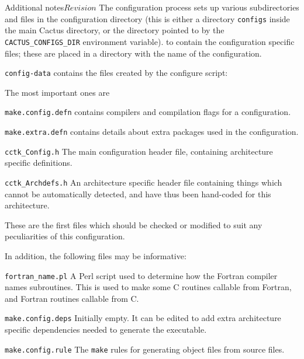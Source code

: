 \begin{cactuspart}{Additional notes}{}{$Revision$}
The configuration process sets up various subdirectories and files in the
configuration
directory (this is either a directory
\texttt{configs} inside the main Cactus directory, or the
directory pointed to by the \texttt{CACTUS\_CONFIGS\_DIR} environment
variable).
to contain the configuration specific files; these
are placed in a directory with the name of the configuration.

\begin{Lentry}

\item [\texttt{config-data}] contains the files created by the configure
script:

The most important ones are

\begin{Lentry}

\item [\texttt{make.config.defn}]
contains compilers and compilation flags for a configuration.

\item [\texttt{make.extra.defn}]
contains details about extra packages used in the configuration.

\item [\texttt{cctk\_Config.h}]
The main configuration header file, containing architecture specific
definitions.

\item [\texttt{cctk\_Archdefs.h}]
An architecture specific header file containing things which cannot be
automatically detected, and have thus been hand-coded for this architecture.
\end{Lentry}

These are the first files which should be checked or modified to suit any
peculiarities of this configuration.

In addition, the following files may be informative:

\begin{Lentry}
\item [\texttt{fortran\_name.pl}]
A Perl script used to determine how the Fortran compiler names subroutines.
This is used to make some C routines callable from Fortran, and Fortran
routines callable from C.

\item [\texttt{make.config.deps}]
Initially empty.  It can be edited to add extra architecture specific dependencies
needed to generate the executable.

\item [\texttt{make.config.rule}]
The \texttt{make} rules for generating object files from source files.


\end{Lentry}
\end{Lentry}
\end{cactuspart}
